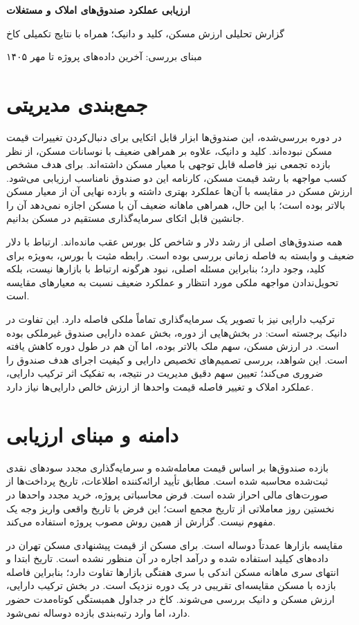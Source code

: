\documentclass[12pt,a4paper]{article}
\begin{document}
{\LARGE\bfseries ارزیابی عملکرد صندوق‌های املاک و مستغلات}\par

گزارش تحلیلی ارزش مسکن، کلید و دانیک؛ همراه با نتایج تکمیلی کاخ

مبنای بررسی: آخرین داده‌های پروژه تا مهر ۱۴۰۵

\section*{جمع‌بندی مدیریتی}

در دوره بررسی‌شده، این صندوق‌ها ابزار قابل اتکایی برای دنبال‌کردن تغییرات قیمت مسکن نبوده‌اند. کلید و دانیک، علاوه بر همراهی ضعیف با نوسانات مسکن، از نظر بازده تجمعی نیز فاصله قابل توجهی با معیار مسکن داشته‌اند. برای هدف مشخص کسب مواجهه با رشد قیمت مسکن، کارنامه این دو صندوق نامناسب ارزیابی می‌شود. ارزش مسکن در مقایسه با آن‌ها عملکرد بهتری داشته و بازده نهایی آن از معیار مسکن بالاتر بوده است؛ با این حال، همراهی ماهانه ضعیف آن با مسکن اجازه نمی‌دهد آن را جانشین قابل اتکای سرمایه‌گذاری مستقیم در مسکن بدانیم.

همه صندوق‌های اصلی از رشد دلار و شاخص کل بورس عقب مانده‌اند. ارتباط با دلار ضعیف و وابسته به فاصله زمانی بررسی بوده است. رابطه مثبت با بورس، به‌ویژه برای کلید، وجود دارد؛ بنابراین مسئله اصلی، نبود هرگونه ارتباط با بازارها نیست، بلکه تحویل‌ندادن مواجهه ملکی مورد انتظار و عملکرد ضعیف نسبت به معیارهای مقایسه است.

ترکیب دارایی نیز با تصویر یک سرمایه‌گذاری تماماً ملکی فاصله دارد. این تفاوت در دانیک برجسته است: در بخش‌هایی از دوره، بخش عمده دارایی صندوق غیرملکی بوده است. در ارزش مسکن، سهم ملک بالاتر بوده، اما آن هم در طول دوره کاهش یافته است. این شواهد، بررسی تصمیم‌های تخصیص دارایی و کیفیت اجرای هدف صندوق را ضروری می‌کند؛ تعیین سهم دقیق مدیریت در نتیجه، به تفکیک اثر ترکیب دارایی، عملکرد املاک و تغییر فاصله قیمت واحدها از ارزش خالص دارایی‌ها نیاز دارد.

\section{دامنه و مبنای ارزیابی}

بازده صندوق‌ها بر اساس قیمت معامله‌شده و سرمایه‌گذاری مجدد سودهای نقدی ثبت‌شده محاسبه شده است. مطابق تأیید ارائه‌کننده اطلاعات، تاریخ پرداخت‌ها از صورت‌های مالی احراز شده است. فرض محاسباتی پروژه، خرید مجدد واحدها در نخستین روز معاملاتی از تاریخ مجمع است؛ این فرض با تاریخ واقعی واریز وجه یک مفهوم نیست. گزارش از همین روش مصوب پروژه استفاده می‌کند.

مقایسه بازارها عمدتاً دوساله است. برای مسکن از قیمت پیشنهادی مسکن تهران در داده‌های کیلید استفاده شده و درآمد اجاره در آن منظور نشده است. تاریخ ابتدا و انتهای سری ماهانه مسکن اندکی با سری هفتگی بازارها تفاوت دارد؛ بنابراین فاصله بازده با مسکن مقایسه‌ای تقریبی در یک دوره نزدیک است. در بخش ترکیب دارایی، ارزش مسکن و دانیک بررسی می‌شوند. کاخ در جداول همبستگی کوتاه‌مدت حضور دارد، اما وارد رتبه‌بندی بازده دوساله نمی‌شود.
\end{document}
